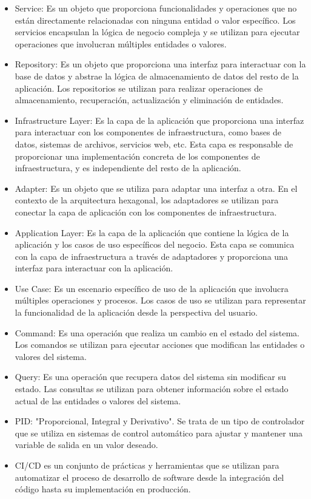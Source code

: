 \begin{itemize}
	\item Service: Es un objeto que proporciona funcionalidades y operaciones que no están directamente relacionadas con ninguna entidad o valor específico. Los servicios encapsulan la lógica de negocio compleja y se utilizan para ejecutar operaciones que involucran múltiples entidades o valores.
	\item Repository: Es un objeto que proporciona una interfaz para interactuar con la base de datos y abstrae la lógica de almacenamiento de datos del resto de la aplicación. Los repositorios se utilizan para realizar operaciones de almacenamiento, recuperación, actualización y eliminación de entidades.
	\item Infrastructure Layer: Es la capa de la aplicación que proporciona una interfaz para interactuar con los componentes de infraestructura, como bases de datos, sistemas de archivos, servicios web, etc. Esta capa es responsable de proporcionar una implementación concreta de los componentes de infraestructura, y es independiente del resto de la aplicación.
	\item Adapter: Es un objeto que se utiliza para adaptar una interfaz a otra. En el contexto de la arquitectura hexagonal, los adaptadores se utilizan para conectar la capa de aplicación con los componentes de infraestructura.
	\item Application Layer: Es la capa de la aplicación que contiene la lógica de la aplicación y los casos de uso específicos del negocio. Esta capa se comunica con la capa de infraestructura a través de adaptadores y proporciona una interfaz para interactuar con la aplicación.
	\item Use Case: Es un escenario específico de uso de la aplicación que involucra múltiples operaciones y procesos. Los casos de uso se utilizan para representar la funcionalidad de la aplicación desde la perspectiva del usuario.
	\item Command: Es una operación que realiza un cambio en el estado del sistema. Los comandos se utilizan para ejecutar acciones que modifican las entidades o valores del sistema.
	\item Query: Es una operación que recupera datos del sistema sin modificar su estado. Las consultas se utilizan para obtener información sobre el estado actual de las entidades o valores del sistema.
	\item PID: "Proporcional, Integral y Derivativo". Se trata de un tipo de controlador que se utiliza en sistemas de control automático para ajustar y mantener una variable de salida en un valor deseado.
	\item CI/CD es un conjunto de prácticas y herramientas que se utilizan para automatizar el proceso de desarrollo de software desde la integración del código hasta su implementación en producción.
\end{itemize} 